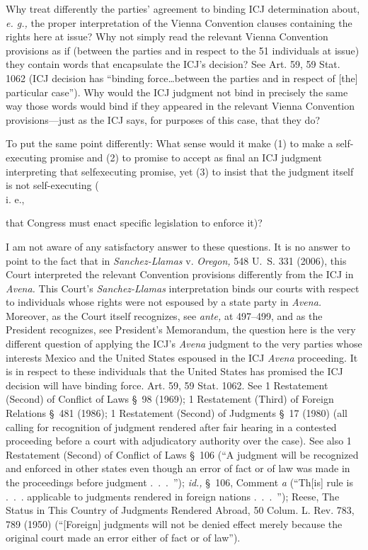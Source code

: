 {  Why treat differently the parties' agreement to binding ICJ
determination about, \emph{e. g.,} the proper interpretation of the Vienna
Convention clauses containing the rights here at issue? Why not simply
read the relevant Vienna Convention provisions as if (between the
parties and in respect to the 51 individuals at issue) they contain
words that encapsulate the ICJ's decision? See Art. 59, 59 Stat.
1062 (ICJ decision has ``binding force\dots between the parties and
in respect of [the] particular case''). Why would the ICJ judgment
not bind in precisely the same way those words would bind if they
appeared in the relevant Vienna Convention provisions---just as the ICJ
says, for purposes of this case, that they do?

  To put the same point differently: What sense would it make (1) to
make a self-executing promise and (2) to promise to accept as final an
ICJ judgment interpreting that selfexecuting promise, yet (3) to insist
that the judgment itself is not self-executing (\\i. e.,} that Congress
must enact specific legislation to enforce it)?

  I am not aware of any satisfactory answer to these questions. It
is no answer to point to the fact that in \emph{Sanchez-Llamas} v.
\emph{Oregon,} 548 U.~S. 331 (2006), this Court interpreted the relevant
Convention provisions differently from the ICJ in \emph{Avena.} This
Court's \emph{Sanchez-Llamas} interpretation binds our courts with
respect to individuals whose rights were not espoused by a state party
in \emph{Avena.} Moreover, as the Court itself recognizes, see \emph{ante,}
at 497--499, and as the President recognizes, see President's
Memorandum, \newpage  the question here is the very different question
of applying the ICJ's \emph{Avena} judgment to the very parties whose
interests Mexico and the United States espoused in the ICJ \emph{Avena}
proceeding. It is in respect to these individuals that the United
States has promised the ICJ decision will have binding force. Art.
59, 59 Stat. 1062. See 1 Restatement (Second) of Conflict of Laws
\S~98 (1969); 1 Restatement (Third) of Foreign Relations \S~481
(1986); 1 Restatement (Second) of Judgments \S~17 (1980) (all calling
for recognition of judgment rendered after fair hearing in a contested
proceeding before a court with adjudicatory authority over the case).
See also 1 Restatement (Second) of Conflict of Laws \S~106 (``A
judgment will be recognized and enforced in other states even though
an error of fact or of law was made in the proceedings before judgment
.~.~.~''); \emph{id.,} \S~106, Comment \emph{a} (``Th[is] rule is .~.~.
applicable to judgments rendered in foreign nations .~.~.~''); Reese,
The Status in This Country of Judgments Rendered Abroad, 50 Colum. L.
Rev. 783, 789 (1950) (``[Foreign] judgments will not be denied effect
merely because the original court made an error either of fact or of
law'').

